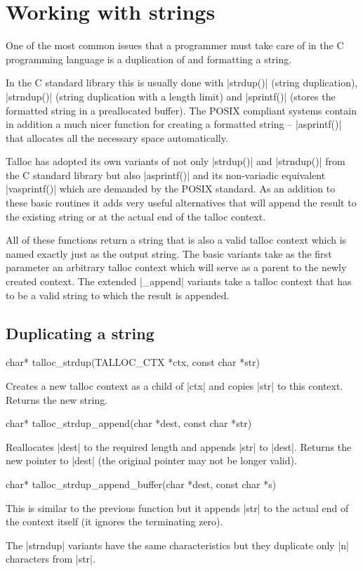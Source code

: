 \section{Working with strings}
\label{talloc:sec:strings}

One of the most common issues that a programmer must take care of in the C
programming language is a duplication of and formatting a string.

In the C standard library this is usually done with |strdup()| (string
duplication), |strndup()| (string duplication with a length limit) and
|sprintf()| (stores the formatted string in a preallocated buffer). The POSIX
compliant systems contain in addition a much nicer function for creating a
formatted string -- |asprintf()| that allocates all the necessary space
automatically.

Talloc has adopted its own variants of not only |strdup()| and |strndup()| from
the C standard library but also |asprintf()| and its non-variadic equivalent
|vasprintf()| which are demanded by the POSIX standard. As an addition to these
basic routines it adds very useful alternatives that will append the result to
the existing string or at the actual end of the talloc context.

All of these functions return a string that is also a valid talloc context
which is named exactly just as the output string. The basic variants take as
the first parameter an arbitrary talloc context which will serve as a parent to
the newly created context. The extended |_append| variants take a talloc context
that has to be a valid string to which the result is appended.

\subsection{Duplicating a string}

\begin{funcproto}
char* talloc_strdup(TALLOC_CTX *ctx, const char *str)
\end{funcproto}
\begin{funcdesc}
  Creates a new talloc context as a child of |ctx| and copies |str| to
  this context. Returns the new string.
\end{funcdesc}
\begin{funcproto}
char* talloc_strdup_append(char *dest, const char *str)
\end{funcproto}
\begin{funcdesc}
  Reallocates |dest| to the required length and appends |str| to |dest|. Returns
  the new pointer to |dest| (the original pointer may not be longer valid).
\end{funcdesc}
\begin{funcproto}
char* talloc_strdup_append_buffer(char *dest, const char *s)
\end{funcproto}
\begin{funcdesc}
  This is similar to the previous function but it appends |str| to the actual
  end of the context itself (it ignores the terminating zero).
\end{funcdesc}
\funclistend
The |strndup| variants have the same characteristics but they duplicate only |n|
characters from |str|.

